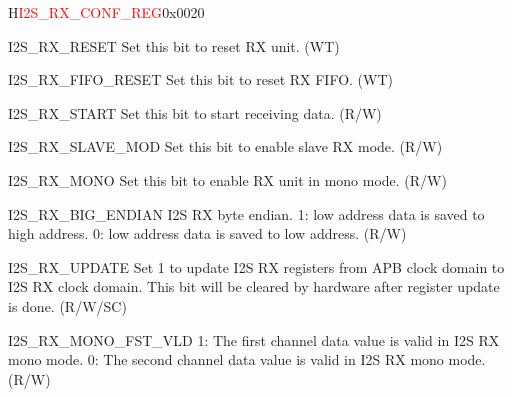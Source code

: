 \begin{register}{H}{\textcolor{red}{I2S\_RX\_CONF\_REG}}{0x{}0020}\label{regdesc:I2SRXCONFREG}
%
%
%
%
%
%
%
%
%
%
%
%
%
%
%
%
%
%
%
%
%
%
\regnewline%
\begin{regdesc}\begin{reglist}
\label{fielddesc:I2SRXRESET}\item [I2S\_RX\_RESET] Set this bit to reset RX unit. (WT)
\label{fielddesc:I2SRXFIFORESET}\item [I2S\_RX\_FIFO\_RESET] Set this bit to reset RX FIFO. (WT)
\label{fielddesc:I2SRXSTART}\item [I2S\_RX\_START] Set this bit to start receiving data. (R/W)
\label{fielddesc:I2SRXSLAVEMOD}\item [I2S\_RX\_SLAVE\_MOD] Set this bit to enable slave RX mode. (R/W)
\label{fielddesc:I2SRXMONO}\item [I2S\_RX\_MONO] Set this bit to enable RX unit in mono mode. (R/W)
\label{fielddesc:I2SRXBIGENDIAN}\item [I2S\_RX\_BIG\_ENDIAN] I2S RX byte endian. 1: low address data is saved to high address. 0: low address data is saved to low address. (R/W)
\label{fielddesc:I2SRXUPDATE}\item [I2S\_RX\_UPDATE] Set 1 to update I2S RX registers from APB clock domain to I2S RX clock domain. This bit will be cleared by hardware after register update is done. (R/W/SC)
\label{fielddesc:I2SRXMONOFSTVLD}\item [I2S\_RX\_MONO\_FST\_VLD] 1: The first channel data value is valid in I2S RX mono mode.   0: The second channel data value is valid in I2S RX mono mode. (R/W)

\end{reglist}
\end{regdesc}
\end{register}
